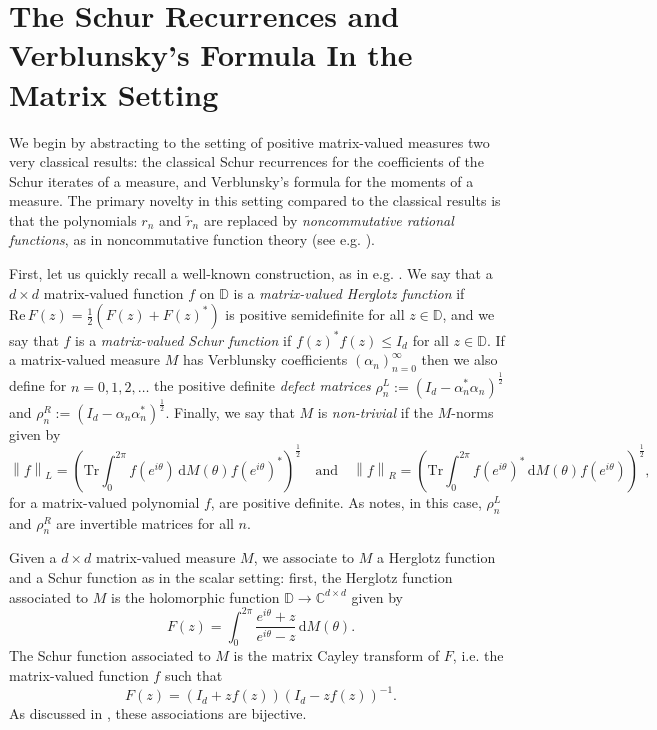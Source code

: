 \documentclass[11pt,reqno]{amsart}
\newcommand\norm[1]{\left\|#1\right\|}
\def\a{\alpha}
\def\r{\rho}
\def\th{\theta}
\def\rmd{\mathrm{d}}
\def\CC{\mathbb{C}}
\def\DD{\mathbb{D}}
\theoremstyle{definition}
\numberwithin{equation}{section}
\renewcommand{\tilde}{\widetilde}
\renewcommand{\Re}{\mathrm{Re}\,}
\begin{document}
\section{The Schur Recurrences and Verblunsky's Formula In the Matrix Setting}
\label{sec:SchurRecVerblunskyForm}

We begin by abstracting to the setting of positive matrix-valued measures two very classical results: the classical Schur recurrences for the coefficients of the Schur iterates of a measure, and Verblunsky's formula for the moments of a measure. The primary novelty in this setting compared to the classical results is that the polynomials \(r_n\) and \(\tilde{r}_n\) are replaced by \emph{noncommutative rational functions}, as in noncommutative function theory (see e.g. \cite{PV21}). 

First, let us quickly recall a well-known construction, as in e.g. \cite{DPS08}. We say that a \(d\times d\) matrix-valued function \(f\) on \(\DD\) is a \emph{matrix-valued Herglotz function} if \(\Re F(z) = \frac12 (F(z) + F(z)^*)\) is positive semidefinite for all \(z \in \DD\), and we say that \(f\) is a  \emph{matrix-valued Schur function} if \(f(z)^*f(z) \leq I_d\) for all \(z \in \DD\). If a matrix-valued measure \(M\) has Verblunsky coefficients \((\a_n)_{n=0}^{\infty}\) then we also define for \(n = 0, 1, 2, \ldots\) the positive definite \emph{defect matrices} \(\r_n^L := (I_d - \a_n^*\a_n)^{\frac12}\) and \(\r_n^R := (I_d - \a_n\a_n^*)^{\frac12}\). Finally, we say that \(M\) is \emph{non-trivial} if the \(M\)-norms given by
\[
    \norm{f}_L = \left(\mathrm{Tr}\int_0^{2\pi} f(e^{i\th}) \, \rmd M(\th) f(e^{i\th})^*\right)^{\frac12} \quad \text{and} \quad \norm{f}_R = \left(\mathrm{Tr}\int_0^{2\pi} f(e^{i\th})^* \, \rmd M(\th) f(e^{i\th})\right)^{\frac12},
\]
for a matrix-valued polynomial \(f\), are positive definite. As \cite{DPS08} notes, in this case, \(\r_n^L\) and \(\r_n^R\) are invertible matrices for all \(n\).

Given a \(d \times d\) matrix-valued measure \(M\), we associate to \(M\) a Herglotz function and a Schur function as in the scalar setting: first, the Herglotz function associated to \(M\) is the holomorphic function \(\DD \to \CC^{d\times d}\) given by
\[
    F(z) = \int_0^{2\pi}\frac{e^{i\th} + z}{e^{i\th} - z} \, \rmd M(\th).
\]
The Schur function associated to \(M\) is the matrix Cayley transform of \(F\), i.e. the matrix-valued function \(f\) such that
\[
    F(z) = (I_d + zf(z))(I_d - zf(z))^{-1}.
\]
As discussed in \cite{DPS08}, these associations are bijective.
\end{document}
